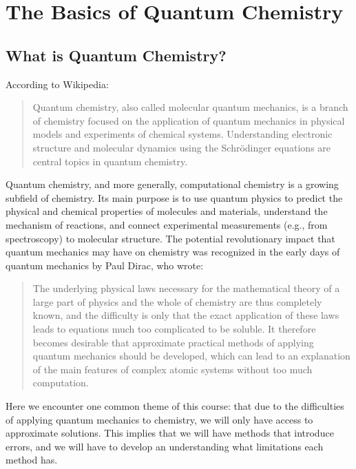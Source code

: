\documentclass[../Main/notes.tex]{subfiles}
\begin{document}
\chapter{The Basics of Quantum Chemistry}

\section{What is Quantum Chemistry?}
According to Wikipedia:
\begin{quotation}
Quantum chemistry, also called molecular quantum mechanics, is a branch of chemistry focused on the application of quantum mechanics in physical models and experiments of chemical systems. Understanding electronic structure and molecular dynamics using the Schrödinger equations are central topics in quantum chemistry.
\end{quotation}

Quantum chemistry, and more generally, computational chemistry is a growing subfield of chemistry.
Its main purpose is to use quantum physics to predict the physical and chemical properties of molecules and materials, understand the mechanism of reactions, and connect experimental measurements (e.g., from spectroscopy) to molecular structure.
The potential revolutionary impact that quantum mechanics may have on chemistry was recognized in the early days of quantum mechanics by Paul Dirac, who wrote:
\begin{quotation}
The underlying physical laws necessary for the mathematical theory of a large part of physics and the whole of chemistry are thus completely known, and the difficulty is only that the exact application of these laws leads to equations much too complicated to be soluble.
It therefore becomes desirable that approximate practical methods of applying quantum mechanics should be developed, which can lead to an explanation of the main features of complex atomic systems without too much computation.
\end{quotation}

Here we encounter one common theme of this course: that due to the difficulties of applying quantum mechanics to chemistry, we will only have access to approximate solutions.
This implies that we will have methods that introduce errors, and we will have to develop an understanding what limitations each method has.
\end{document}
